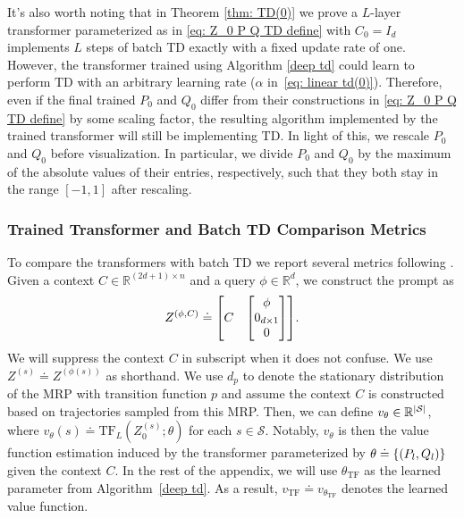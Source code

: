 \documentclass{article}
\newcommand{\fS}{\mathcal{S}}
\newcommand{\R}{\mathbb{R}}
\newcommand{\tf}{\text{TF}}
\newcommand{\td}{\text{TD}}
\begin{document}
It's also worth noting that in Theorem \ref{thm: TD(0)} we prove a $L$-layer transformer parameterized as in \eqref{eq: Z_0 P Q TD define} with $C_0 = I_d$ implements $L$ steps of batch TD exactly with a fixed update rate of one. However, the transformer trained using Algorithm \ref{deep td} could learn to perform $\td$ with an arbitrary learning rate ($\alpha$ in~\eqref{eq: linear td(0)}). Therefore, even if the final trained $P_0$ and $Q_0$ differ from their constructions in \eqref{eq: Z_0 P Q TD define} by some scaling factor, the resulting algorithm implemented by the trained transformer will still be implementing TD.
In light of this,
we rescale $P_0$ and $Q_0$ before visualization.
In particular, we divide $P_0$ and $Q_0$ by the maximum of the absolute values of their entries, respectively, such that they both stay in the range $[-1, 1]$ after rescaling.

\subsubsection{Trained Transformer and Batch TD Comparison Metrics} \label{appendix: comparison metrics}
To compare the transformers with batch TD we report several metrics following \citet{vonoswald2023transformers, akyurek2023learning}. 
Given a context $C \in \R^{(2d+1) \times n}$ and a query $\phi \in \R^d$,
we construct the prompt as
\begin{align}
    Z^{(\phi, C)} \doteq \mqty[C & \mqty[\phi \\ 0_{d \times 1} \\ 0]].
\end{align}
We will suppress the context $C$ in subscript when it does not confuse.
We use $Z^{(s)} \doteq Z^{(\phi(s))}$ as shorthand.
We use $d_p$ to denote the stationary distribution of the MRP with transition function $p$
and assume the context $C$ is constructed based on trajectories sampled from this MRP.
Then, we can define $v_{\theta} \in \R^{\abs{\fS}}$, where $v_{\theta}(s) \doteq \tf_L(Z_0^{(s)}; \theta)$ for each $s \in \mathcal{S}$.
Notably,
$v_\theta$ is then the value function estimation induced by the transformer parameterized by $\theta \doteq \qty{(P_l, Q_l)}$ given the context $C$.
In the rest of the appendix,
we will use $\theta_\tf$ as the learned parameter from Algorithm~\ref{deep td}.
As a result, $v_\tf \doteq v_{\theta_\tf}$ denotes the learned value function.
\end{document}
